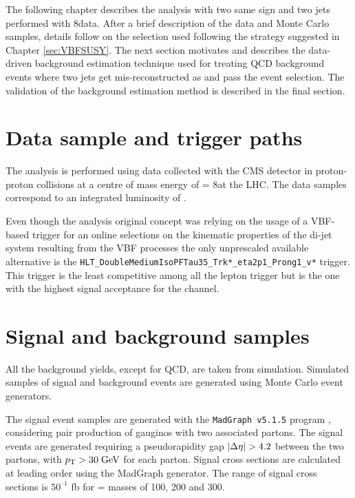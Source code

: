 
The following chapter describes the analysis with two same sign \hadtau and two jets performed with 8\tev data. After a brief description of the data and Monte Carlo samples, details follow on the selection used following the strategy suggested in Chapter \ref{sec:VBFSUSY}. The next section motivates and describes the data-driven background estimation technique used for treating QCD background events where two jets get mis-reconstructed as \hadtau and pass the event selection. The validation of the background estimation method is described in the final section.

\section {Data sample and trigger paths}

The analysis is performed using data collected with the CMS detector
in proton-proton collisions at a centre of mass energy of \CM = 8\tev at the LHC. The data samples correspond to an integrated luminosity of \lumiOld. 

Even though the analysis original concept was relying on the usage of a VBF-based trigger for an online selections on the kinematic properties of the di-jet system resulting from the VBF processes the only unprescaled available alternative is the \texttt{HLT\_\-DoubleMedium\-IsoPFTau35\_\-Trk*\_\-eta2p1\_\-Prong1\_\-v*} trigger. This trigger is the least competitive among all the lepton trigger but is the one with the highest signal acceptance for the \hadtau channel.

\section{Signal and background samples}



All the background yields, except for QCD, are taken from simulation. Simulated samples of signal and background events are generated using Monte Carlo event generators.

The signal event samples are generated with the \texttt{MadGraph v5.1.5} program \cite{Alwall:2011uj}, considering pair production of gauginos with two associated partons. The signal events are generated requiring a pseudorapidity gap $|\Delta\eta| > 4.2$ between the two partons, with $p_{\text{T}} > 30\;\text{Ge}\kern-0.06667em\text{V}$ for each parton. Signal cross sections are calculated at leading order using the MadGraph generator. The range of signal cross sections is $50^{–1}$ fb for \charginopm = \neutralinotwo masses of 100, 200 and 300\gev.

